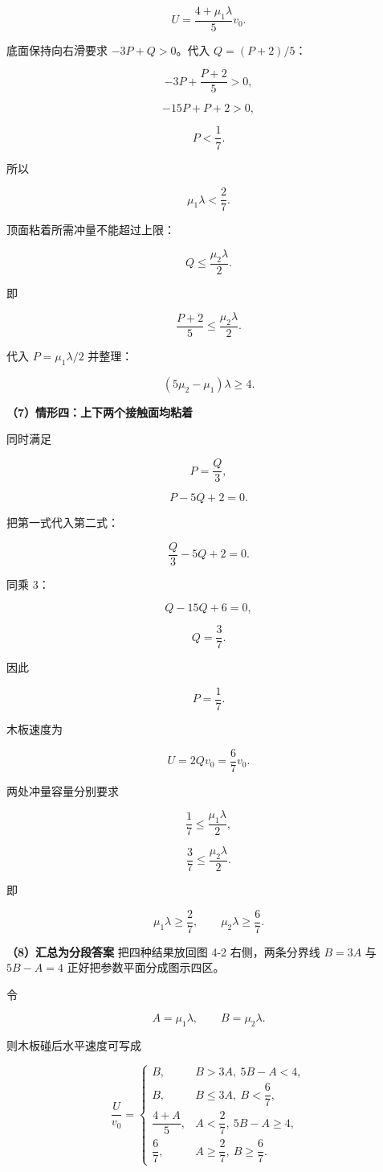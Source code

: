\documentclass[12pt,a4paper,UTF8]{ctexart}
\begin{document}
\[\boxed{U=\frac{4+\mu_1\lambda}{5}v_0}.\]

底面保持向右滑要求 \(-3P+Q>0\)。代入 \(Q=(P+2)/5\)：

\[-3P+\frac{P+2}{5}>0,\]

\[-15P+P+2>0,\]

\[P<\frac17.\]

所以

\[\boxed{\mu_1\lambda<\frac27}.\]

顶面粘着所需冲量不能超过上限：

\[Q\le\frac{\mu_2\lambda}{2}.\]

即

\[\frac{P+2}{5}\le\frac{\mu_2\lambda}{2}.\]

代入 \(P=\mu_1\lambda/2\) 并整理：

\[\boxed{(5\mu_2-\mu_1)\lambda\ge4}.\]

\textbf{（7）情形四：上下两个接触面均粘着}

同时满足

\[P=\frac Q3,\]

\[P-5Q+2=0.\]

把第一式代入第二式：

\[\frac Q3-5Q+2=0.\]

同乘 \(3\)：

\[Q-15Q+6=0,\]

\[Q=\frac37.\]

因此

\[P=\frac17.\]

木板速度为

\[\boxed{U=2Qv_0=\frac67v_0}.\]

两处冲量容量分别要求

\[\frac17\le\frac{\mu_1\lambda}{2},\]

\[\frac37\le\frac{\mu_2\lambda}{2}.\]

即

\[\boxed{
\mu_1\lambda\ge\frac27,
\qquad
\mu_2\lambda\ge\frac67
}.\]

\textbf{（8）汇总为分段答案} 把四种结果放回图 4-2 右侧，两条分界线
\(B=3A\) 与 \(5B-A=4\) 正好把参数平面分成图示四区。

令

\[A=\mu_1\lambda,
\qquad B=\mu_2\lambda.\]

则木板碰后水平速度可写成

\[\boxed{
\frac U{v_0}=
\begin{cases}
B,
&B>3A,\ 5B-A<4,\\[3pt]
B,
&B\le3A,\ B<\dfrac67,\\[6pt]
\dfrac{4+A}{5},
&A<\dfrac27,\ 5B-A\ge4,\\[8pt]
\dfrac67,
&A\ge\dfrac27,\ B\ge\dfrac67.
\end{cases}}
\]
\end{document}
